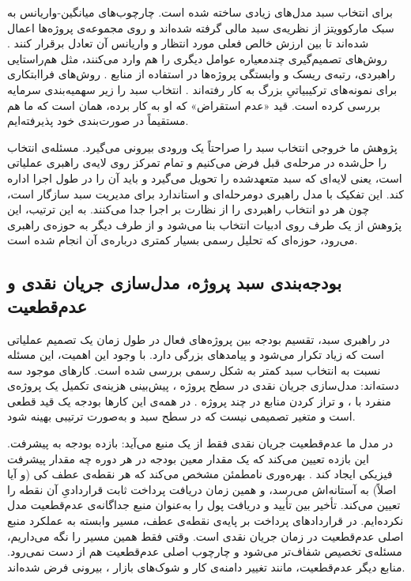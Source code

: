 برای انتخاب سبد مدل‌های زیادی ساخته شده است.
چارچوب‌های میانگین-واریانس به سبک مارکوویتز
\citep{Markowitz1952} از نظریه‌ی سبد مالی گرفته شده‌اند و روی
مجموعه‌ی پروژه‌ها اعمال شده‌اند تا بین ارزش خالص فعلی مورد انتظار و
واریانس آن تعادل برقرار کنند \citep{Eilat2006}.
روش‌های تصمیم‌گیری چندمعیاره عوامل دیگری را هم وارد می‌کنند، مثل
هم‌راستایی راهبردی، رتبه‌ی ریسک و وابستگی پروژه‌ها در استفاده از
منابع \citep{Martinsuo2007, Killen2008}.
روش‌های فرا‌ابتکاری برای نمونه‌های ترکیبیاتیِ بزرگ به کار رفته‌اند
\citep{Zhang2020}.
\citep{kavadias2003resource} انتخاب سبد را زیر سهمیه‌بندی سرمایه
بررسی کرده است. قید «عدم استقراض» که او به کار برده، همان است که
ما هم مستقیماً در صورت‌بندی خود پذیرفته‌ایم.

پژوهش ما خروجی انتخاب سبد را صراحتاً یک ورودی بیرونی می‌گیرد.
مسئله‌ی انتخاب را حل‌شده در مرحله‌ی قبل فرض می‌کنیم و تمام تمرکز
روی لایه‌ی راهبری عملیاتی است، یعنی لایه‌ای که سبد متعهدشده را تحویل
می‌گیرد و باید آن را در طول اجرا اداره کند.
این تفکیک با مدل راهبری دومرحله‌ای \citep{Turner2014} و استاندارد
 برای مدیریت سبد \citep{PMI2017} سازگار است، چون هر دو
انتخاب راهبردی را از نظارت بر اجرا جدا می‌کنند.
به این ترتیب، این پژوهش از یک طرف روی ادبیات انتخاب بنا می‌شود و از
طرف دیگر به حوزه‌ی راهبری می‌رود، حوزه‌ای که تحلیل رسمی بسیار
کمتری درباره‌ی آن انجام شده است.

\subsection{بودجه‌بندی سبد پروژه، مدل‌سازی جریان نقدی و عدم‌قطعیت}
\label{subsec:lr_cashflow}

در راهبری سبد، تقسیم بودجه بین پروژه‌های فعال در طول زمان یک تصمیم
عملیاتی است که زیاد تکرار می‌شود و پیامدهای بزرگی دارد.
با وجود این اهمیت، این مسئله نسبت به انتخاب سبد کمتر به شکل رسمی
بررسی شده است.
کارهای موجود سه دسته‌اند: مدل‌سازی جریان نقدی در سطح پروژه
\citep{Kenley2009, Park2004}، پیش‌بینی هزینه‌ی تکمیل یک پروژه‌ی
منفرد با  \citep{Kim2002, Acebes2015}، و تراز کردن منابع
در چند پروژه \citep{Lova2000, Peteghem2010}.
در همه‌ی این کارها بودجه یک قید قطعی است و متغیر تصمیمی نیست که در
سطح سبد و به‌صورت ترتیبی بهینه شود.

در مدل ما عدم‌قطعیت جریان نقدی فقط از یک منبع می‌آید: بازده بودجه به
پیشرفت. این بازده تعیین می‌کند که یک مقدار معین بودجه در هر دوره چه
مقدار پیشرفت فیزیکی ایجاد کند \citep{Acebes2015, Batselier2017}.
بهره‌وری نامطمئن مشخص می‌کند که هر نقطه‌ی عطف کی (و آیا اصلاً) به
آستانه‌اش می‌رسد، و همین زمان دریافت پرداخت ثابت قراردادیِ آن نقطه
را تعیین می‌کند.
تأخیر بین تأیید و دریافت پول را به‌عنوان منبع جداگانه‌ی عدم‌قطعیت
مدل نکرده‌ایم. در قراردادهای پرداخت بر پایه‌ی نقطه‌ی عطف، مسیر
وابسته به عملکرد منبع اصلی عدم‌قطعیت در زمان جریان نقدی است. وقتی
فقط همین مسیر را نگه می‌داریم، مسئله‌ی تخصیص شفاف‌تر می‌شود و
چارچوب اصلی عدم‌قطعیت هم از دست نمی‌رود.
منابع دیگر عدم‌قطعیت، مانند تغییر دامنه‌ی کار و شوک‌های بازار
\citep{Doloi2012}، بیرونی فرض شده‌اند.

